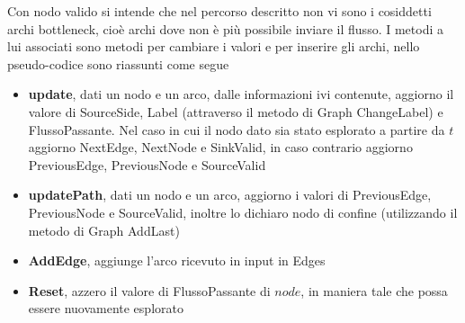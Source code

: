 \documentclass{article}
\begin{document}
Con nodo valido si intende che nel percorso descritto non vi sono i cosiddetti archi bottleneck, cioè archi dove non è più possibile inviare il flusso.
I metodi a lui associati sono metodi per cambiare i valori e per inserire gli archi, nello pseudo-codice sono riassunti come segue
\begin{itemize}
    \item \textbf{update}, dati un nodo e un arco, dalle informazioni ivi contenute, aggiorno il valore di SourceSide, Label (attraverso il metodo di Graph ChangeLabel) e FlussoPassante. Nel caso in cui il nodo dato sia stato esplorato a partire da $t$ aggiorno NextEdge, NextNode e SinkValid, in caso contrario aggiorno PreviousEdge, PreviousNode e SourceValid
    \item \textbf{updatePath}, dati un nodo e un arco,  aggiorno i valori di PreviousEdge, PreviousNode e SourceValid, inoltre lo dichiaro nodo di confine (utilizzando il metodo di Graph AddLast)
    \item \textbf{AddEdge}, aggiunge l'arco ricevuto in input in Edges
    \item \textbf{Reset}, azzero il  valore di FlussoPassante di $node$, in maniera tale che possa essere nuovamente esplorato
\end{itemize}
\end{document}
